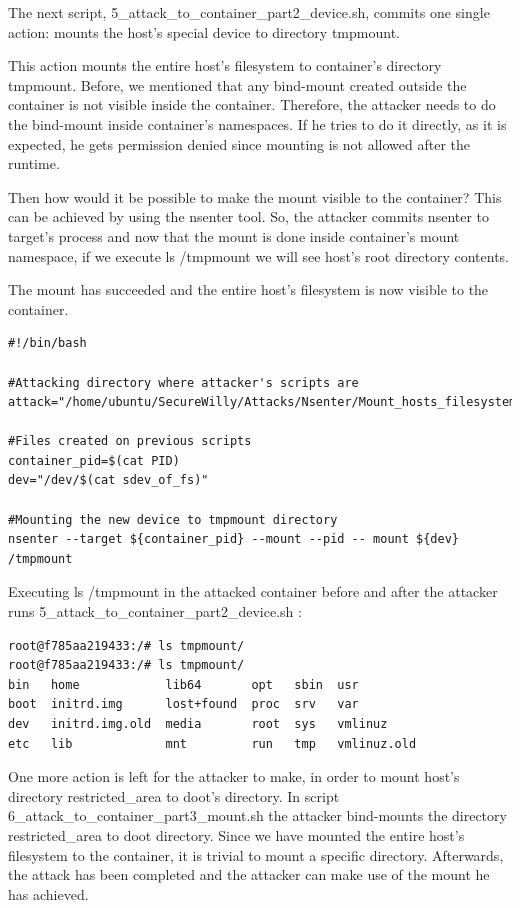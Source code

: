 The next script, 5\_attack\_to\_container\_part2\_device.sh, commits one single action: mounts the host's special device to directory tmpmount. 

This action mounts the entire host's filesystem to container's directory tmpmount. Before, we mentioned that any bind-mount created outside the container is not visible inside the container. Therefore, the attacker needs to do the bind-mount inside container's namespaces. If he tries to do it directly, as it is expected, he gets permission denied since mounting is not allowed after the runtime.

Then how would it be possible to make the mount visible to the container? This can be achieved by using the nsenter tool. So, the attacker commits nsenter to target's process and now that the mount is done inside container's mount namespace, if we execute ls /tmpmount we will see host's root directory contents.

The mount has succeeded and the entire host's filesystem is now visible to the container.

\begin{lstlisting}[style=bashscript, caption={5\_attack\_to\_container\_part2\_device.sh}]
#!/bin/bash

#Attacking directory where attacker's scripts are
attack="/home/ubuntu/SecureWilly/Attacks/Nsenter/Mount_hosts_filesystem"

#Files created on previous scripts
container_pid=$(cat PID)
dev="/dev/$(cat sdev_of_fs)"

#Mounting the new device to tmpmount directory
nsenter --target ${container_pid} --mount --pid -- mount ${dev} /tmpmount
\end{lstlisting}

Executing ls /tmpmount in the attacked container before and after the attacker runs 5\_attack\_to\_container\_part2\_device.sh :

\begin{lstlisting}[style=dockercommands]
root@f785aa219433:/# ls tmpmount/
root@f785aa219433:/# ls tmpmount/
bin   home            lib64       opt   sbin  usr
boot  initrd.img      lost+found  proc  srv   var
dev   initrd.img.old  media       root  sys   vmlinuz
etc   lib             mnt         run   tmp   vmlinuz.old
\end{lstlisting}


One more action is left for the attacker to make, in order to mount host's directory restricted\_area to doot's directory. In script 6\_attack\_to\_container\_part3\_mount.sh the attacker bind-mounts the directory restricted\_area to doot directory. Since we have mounted the entire host's filesystem to the container, it is trivial to mount a specific directory. Afterwards, the attack has been completed and the attacker can make use of the mount he has achieved.

